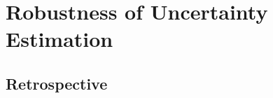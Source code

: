 \chapter{Robustness of Uncertainty Estimation}
\label{chap:iid_robustness}








\section*{Retrospective}
%